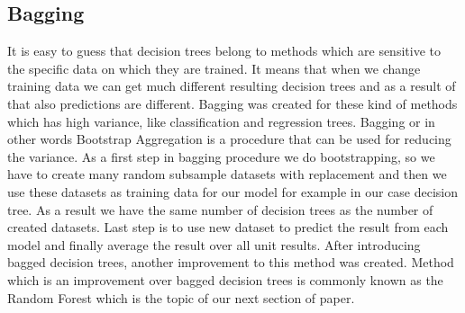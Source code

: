 \subsection{Bagging}
It is easy to guess that decision trees belong to methods which are sensitive to the specific data on which they are trained. It means that when we change training data 
we can get much different resulting decision trees and as a result of that also predictions are different. 
Bagging was created for these kind of methods which has high variance, like classification and regression trees.
Bagging or in other words Bootstrap Aggregation is a procedure that can be used for reducing the variance.
As a first step in bagging procedure we do bootstrapping, so we have to create many random subsample datasets with replacement
and then we use these datasets as training data for our model for example in our case decision tree. As a result we have the same number
of decision trees as the number of created datasets. Last step is to use new dataset to predict the result from each model and finally average the result 
over all unit results. After introducing bagged decision trees, another improvement to this method was created. Method which is an improvement over bagged decision trees 
is commonly known as the Random Forest which is the topic of our next section of paper.
